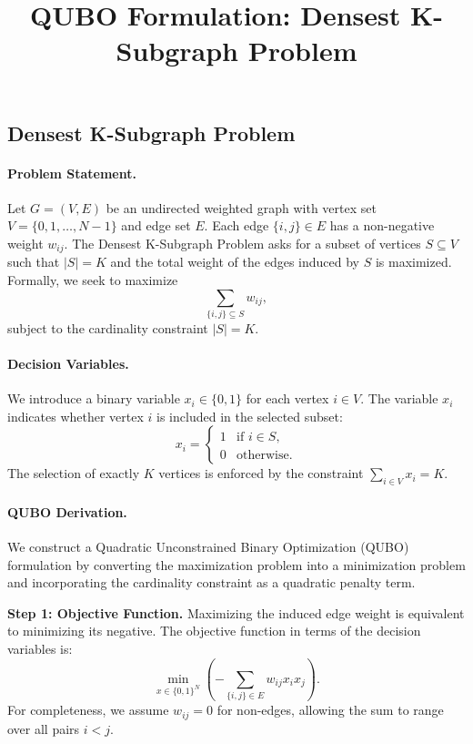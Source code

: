 \documentclass[12pt]{article}
\title{QUBO Formulation: Densest K-Subgraph Problem}
\date{}
\begin{document}
\maketitle

\subsection*{Densest K-Subgraph Problem}

\paragraph{Problem Statement.}
Let $G = (V, E)$ be an undirected weighted graph with vertex set $V = \{0, 1, \dots, N-1\}$ and edge set $E$. Each edge $\{i, j\} \in E$ has a non-negative weight $w_{ij}$. The Densest K-Subgraph Problem asks for a subset of vertices $S \subseteq V$ such that $|S| = K$ and the total weight of the edges induced by $S$ is maximized. Formally, we seek to maximize
\begin{equation}
    \sum_{\{i, j\} \subseteq S} w_{ij},
\end{equation}
subject to the cardinality constraint $|S| = K$.

\paragraph{Decision Variables.}
We introduce a binary variable $x_i \in \{0, 1\}$ for each vertex $i \in V$. The variable $x_i$ indicates whether vertex $i$ is included in the selected subset:
\begin{equation}
    x_i = \begin{cases}
        1 & \text{if } i \in S, \\
        0 & \text{otherwise}.
    \end{cases}
\end{equation}
The selection of exactly $K$ vertices is enforced by the constraint $\sum_{i \in V} x_i = K$.

\paragraph{QUBO Derivation.}
We construct a Quadratic Unconstrained Binary Optimization (QUBO) formulation by converting the maximization problem into a minimization problem and incorporating the cardinality constraint as a quadratic penalty term.

\textbf{Step 1: Objective Function.}
Maximizing the induced edge weight is equivalent to minimizing its negative. The objective function in terms of the decision variables is:
\begin{equation}
    \min_{x \in \{0,1\}^N} \left( -\sum_{\{i, j\} \in E} w_{ij} x_i x_j \right).
\end{equation}
For completeness, we assume $w_{ij} = 0$ for non-edges, allowing the sum to range over all pairs $i < j$.
\end{document}
